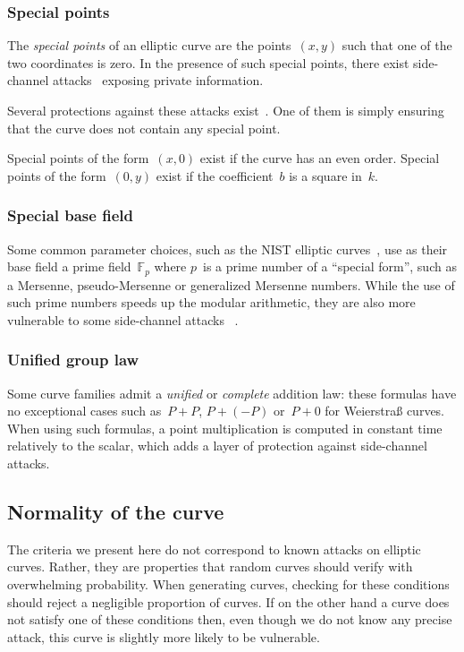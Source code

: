 \documentclass[twocolumn,letterpaper]{article}
\def\F{\mathbb{F}}
\begin{document}
\subsubsection{Special points}
\label{sss:special-points}

The \emph{special points} of an elliptic curve
are the points~$(x,y)$ such that one of the two coordinates is zero.
In the presence of such special points,
there exist side-channel attacks~\cite{pkc2003goubin}
exposing private information.

Several protections against these attacks exist~\cite{ches2004mmm}.
One of them is simply ensuring that the curve does not contain
any special point.

Special points of the form~$(x, 0)$ exist if the curve has
an even order.
Special points of the form~$(0, y)$ exist if the coefficient~$b$
is a square in~$k$.

\subsubsection{Special base field}
\label{sss:special-side}

Some common parameter choices,
such as the NIST elliptic curves~\cite{nist2000fips186-2},
use as their base field a prime field~$\F_p$
where $p$~is a prime number of a ``special form'',
such as a Mersenne, pseudo-Mersenne or generalized Mersenne numbers.
While the use of such prime numbers speeds up the modular arithmetic,
they are also more vulnerable to some side-channel attacks%
~\cite{ches2005dkj,ics2005ss,ches2014bpsy,eprint2014-434}.

\subsubsection{Unified group law}
\label{sss:unified}

Some curve families admit a \emph{unified} or \emph{complete}
addition law: these formulas have no exceptional cases
such as~$P + P$, $P + (-P)$ or~$P + 0$ for Weierstraß curves.
When using such formulas, a point multiplication
is computed in constant time relatively to the scalar,
which adds a layer of protection against side-channel attacks.

\subsection{Normality of the curve}
\label{ss:normal}

The criteria we present here do not correspond to
known attacks on elliptic curves.
Rather, they are properties that random curves should verify
with overwhelming probability.
When generating curves, checking for these conditions
should reject a negligible proportion of curves.
If on the other hand a curve does not satisfy one of these conditions
then, even though we do not know any precise attack,
this curve is slightly more likely to be vulnerable.
\end{document}
